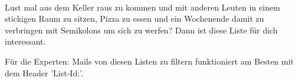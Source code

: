 \begin{description}
  	
  \item[coding\At fsi.uni-tuebingen.de (Hackathons uä.)] ~\\
  	Lust mal aus dem Keller raus zu kommen und mit anderen Leuten in einem stickigen Raum 
  	zu sitzen, Pizza zu essen und ein Wochenende damit zu verbringen mit Semikolons um 
  	sich zu werfen? Dann ist diese Liste für dich interessant.
  	

\end{description}

Für die Experten: Mails von diesen Listen zu filtern funktioniert am Besten mit dem Header 'List-Id:'.
